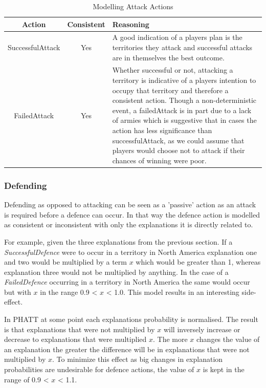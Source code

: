 \documentclass[parskip]{cs4rep}
\begin{document}
\begin{table}[ht]
\centering
\begin{tabular}{|c|c|p{8cm}|}
\hline 
\textbf{Action} & \textbf{Consistent}  & \textbf{Reasoning} \\ 
\hline 
SuccessfulAttack & Yes & A good indication of a players plan is the territories they attack and successful attacks are in themselves the best outcome. \\ 
\hline 
FailedAttack & Yes & Whether successful or not, attacking a territory is indicative of a players intention to occupy that territory and therefore a consistent action. Though a non-deterministic event, a failedAttack is in part due to a lack of armies which is suggestive that in cases the action has less significance than successfulAttack, as we could assume that players would choose not to attack if their chances of winning were poor.\\ 
\hline
\end{tabular}
\caption{Modelling Attack Actions}
\label{table:attack-modelling}
\end{table}

\newpage

\subsubsection{Defending}

Defending as opposed to attacking can be seen as a 'passive' action as an attack is required before a defence can occur. In that way the defence action is modelled as consistent or inconsistent with only the explanations it is directly related to. 

For example, given the three explanations from the previous section. If a \textit{SuccessfulDefence} were to occur in a territory in North America explanation one and two would be multiplied by a term $x$ which would be greater than 1, whereas explanation three would not be multiplied by anything. In the case of a \textit{FailedDefence} occurring in a territory in North America the same would occur but with $x$ in the range 0.9 < $x$ < 1.0. This model results in an interesting side-effect.

In PHATT at some point each explanations probability is normalised. The result is that explanations that were not multiplied by $x$ will inversely increase or decrease to explanations that were multiplied $x$. The more $x$ changes the value of an explanation the greater the difference will be in explanations that were not multiplied by $x$. To minimize this effect as big changes in explanation probabilities are undesirable for defence actions, the value of $x$ is kept in the range of 0.9 < $x$ < 1.1.
\end{document}
